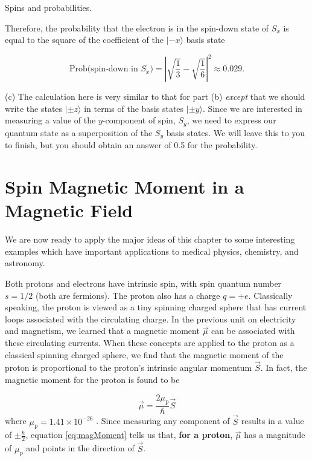 \begin{example}{Spins and probabilities.}
\begin{solution}
Therefore, the probability that the electron is in the spin-down state of $S_x$ is equal to the square of the coefficient of the $|\mbox{$-x$}\rangle$ basis state

\begin{equation}
\mbox{Prob}\bigl(\mbox{spin-down in $S_x$}\bigr) = \left|\sqrt{\frac{1}{3}} - \sqrt{\frac{1}{6}}\right|^2 \approx 0.029 .
\end{equation} 

(c) The calculation here is very similar to that for part (b) {\em except}
that we should write the states $|\mbox{$\pm z$}\rangle$ in terms of
the basis states $|\mbox{$\pm y$}\rangle$.  Since we are interested
in measuring a value of the $y$-component of spin, $S_y$, we need to
express our quantum state as a superposition of the $S_y$ basis states.
We will leave this to you to finish, but you should obtain an answer of
0.5 for the probability.  
\end{solution}
\end{example}

\section{Spin Magnetic Moment in a Magnetic Field}
\label{sec:spin_magnetic_moment}

We are now ready to apply the major ideas of this chapter to
some interesting examples which have important applications to 
medical physics, chemistry, and astronomy.

Both protons and electrons have intrinsic spin, with spin quantum
number $s = 1/2$ (both are fermions).  
The proton also has a charge $q = +e$.
Classically speaking, the proton is viewed as a tiny spinning charged
sphere that has current loops associated with the circulating charge.
In the previous unit on electricity and magnetism, we learned that a
magnetic moment $\vec{\mu}$ can be associated with these circulating
currents.  When these concepts are applied to the proton as a classical
spinning charged sphere, we find that the magnetic moment of the proton
is proportional to the proton's intrinsic angular momentum $\vec{S}$.
In fact, the magnetic moment for the proton is found to be

\begin{equation}
\vec{\mu} = \frac{2 \mu_\text{p}}{\hbar} \vec{S}
\label{eq:magMoment}
\end{equation}
where $\mu_\text{p} = 1.41 \times 10^{-26}$ .  Since measuring any component of $\vec{S}$ results in a value of $\pm \frac{\hbar}{2}$, equation \ref{eq:magMoment} tells us that, {\bf for a proton}, $\vec{\mu}$ has a magnitude of $\mu_\text{p}$ and points in the direction of $\vec{S}$.

